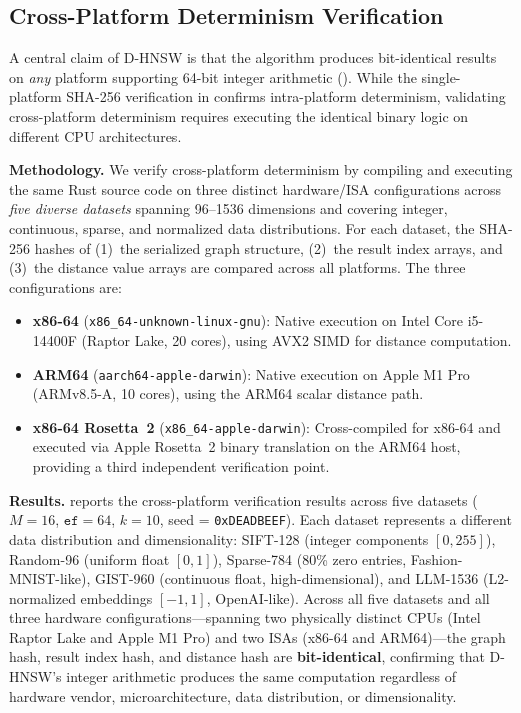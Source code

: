 \documentclass[10pt,journal]{IEEEtran}
\newcommand{\dhnsw}{\textsc{D-HNSW}}
\begin{document}
\subsection{Cross-Platform Determinism Verification}
\label{sec:crossplatform_exp}

A central claim of \dhnsw{} is that the algorithm produces bit-identical results on \emph{any} platform supporting 64-bit integer arithmetic (). While the single-platform SHA-256 verification in  confirms intra-platform determinism, validating cross-platform determinism requires executing the identical binary logic on different CPU architectures.

\textbf{Methodology.} We verify cross-platform determinism by compiling and executing the same Rust source code on three distinct hardware/ISA configurations across \emph{five diverse datasets} spanning 96--1536 dimensions and covering integer, continuous, sparse, and normalized data distributions. For each dataset, the SHA-256 hashes of (1)~the serialized graph structure, (2)~the result index arrays, and (3)~the distance value arrays are compared across all platforms. The three configurations are:

\begin{itemize}[leftmargin=*]
  \item \textbf{x86-64} (\texttt{x86\_64-unknown-linux-gnu}): Native execution on Intel Core i5-14400F (Raptor Lake, 20 cores), using AVX2 SIMD for distance computation.
  \item \textbf{ARM64} (\texttt{aarch64-apple-darwin}): Native execution on Apple M1 Pro (ARMv8.5-A, 10 cores), using the ARM64 scalar distance path.
  \item \textbf{x86-64 Rosetta~2} (\texttt{x86\_64-apple-darwin}): Cross-compiled for x86-64 and executed via Apple Rosetta~2 binary translation on the ARM64 host, providing a third independent verification point.
\end{itemize}

\textbf{Results.}  reports the cross-platform verification results across five datasets ($M{=}16$, $\texttt{ef}{=}64$, $k{=}10$, seed = \texttt{0xDEADBEEF}). Each dataset represents a different data distribution and dimensionality: SIFT-128 (integer components $[0,255]$), Random-96 (uniform float $[0,1]$), Sparse-784 (80\% zero entries, Fashion-MNIST-like), GIST-960 (continuous float, high-dimensional), and LLM-1536 (L2-normalized embeddings $[-1,1]$, OpenAI-like). Across all five datasets and all three hardware configurations---spanning two physically distinct CPUs (Intel Raptor Lake and Apple M1 Pro) and two ISAs (x86-64 and ARM64)---the graph hash, result index hash, and distance hash are \textbf{bit-identical}, confirming that \dhnsw{}'s integer arithmetic produces the same computation regardless of hardware vendor, microarchitecture, data distribution, or dimensionality.
\end{document}
